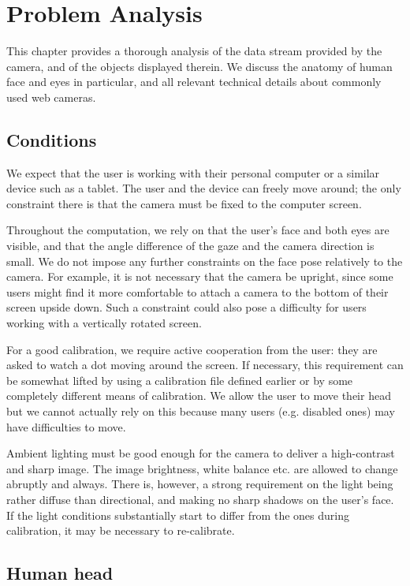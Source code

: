 \chapter{Problem Analysis}
\label{s:analy}
This chapter provides a thorough analysis of the data stream provided by the camera, and of the objects displayed therein.
We discuss the anatomy of human face and eyes in particular, and all relevant technical details about commonly used web cameras.

\section{Conditions}

We expect that the user is working with their personal computer or a similar device such as a tablet.
The user and the device can freely move around; the only constraint there is that the camera must be fixed to the computer screen.

Throughout the computation, we rely on that the user's face and both eyes are visible, and that the angle difference of the gaze and the camera direction is small.
We do not impose any further constraints on the face pose relatively to the camera.
For example, it is not necessary that the camera be upright, since some users might find it more comfortable to attach a camera to the bottom of their screen upside down.
Such a constraint could also pose a difficulty for users working with a vertically rotated screen.

For a good calibration, we require active cooperation from the user: they are asked to watch a dot moving around the screen.
If necessary, this requirement can be somewhat lifted by using a calibration file defined earlier or by some completely different means of calibration.
We allow the user to move their head but we cannot actually rely on this because many users (e.g. disabled ones) may have difficulties to move.

Ambient lighting must be good enough for the camera to deliver a high-contrast and sharp image.
The image brightness, white balance etc. are allowed to change abruptly and always.
There is, however, a strong requirement on the light being rather diffuse than directional, and making no sharp shadows on the user's face.
If the light conditions substantially start to differ from the ones during calibration, it may be necessary to re-calibrate.

\section{Human head}

